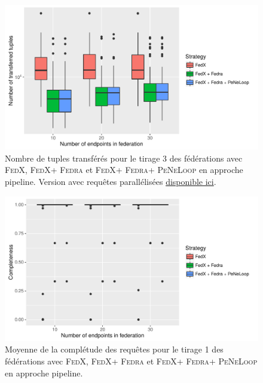 \documentclass[a4paper]{article}
\def\fedra{\textsc{Fedra}\xspace}
\def\fedx{\textsc{FedX}\xspace}
\def\peneloop{\textsc{PeNeLoop}\xspace}
\newcommand{\parallelLink}[1]{Version avec requêtes parallélisées \href{#1}{disponible ici}.}
\begin{document}
\begin{figure}[h]
    \centering
    \includegraphics{boxplots/fed3_transferred_tuples.pdf}
    \caption{Nombre de tuples transférés pour le tirage 3 des fédérations avec \fedx, \fedx + \fedra et \fedx + \fedra + \peneloop en approche pipeline. \parallelLink{https://github.com/Callidon/ParallelNestedLoop/blob/master/results/definitive/fed3_pll_transferred_tuples.pdf}}
    \label{fig:fed3_tuples}
\end{figure}

\begin{figure}[h]
    \centering
    \includegraphics{boxplots/avg_completeness.pdf}
    \caption{Moyenne de la complétude des requêtes pour le tirage 1 des fédérations avec \fedx, \fedx + \fedra et \fedx + \fedra + \peneloop en approche pipeline.}
    \label{fig:avg_compl}
\end{figure}
\end{document}
